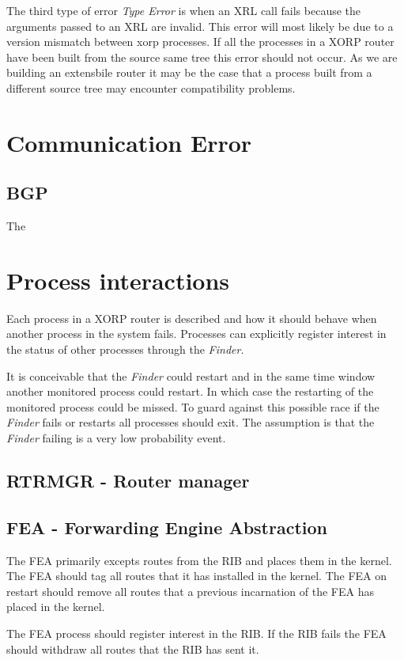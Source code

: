 \documentclass[11pt]{article}
\makeatletter
\newcommand{\finder} {{\em Finder}\@\xspace}
\makeatother
\begin{document}
The third type of error {\em Type Error} is when an XRL call fails
because the arguments passed to an XRL are invalid. This error will
most likely be due to a version mismatch between xorp processes. If
all the processes in a XORP router have been built from the source
same tree this error should not occur. As we are building an
extensbile router it may be the case that a process built from a
different source tree may encounter compatibility problems.

\section{Communication Error}

\subsection{BGP}
The 

\section{Process interactions}
Each process in a XORP router is described and how it should behave
when another process in the system fails. Processes can explicitly
register interest in the status of other processes through the
\finder.

It is conceivable that the \finder could restart and in the same time
window another monitored process could restart. In which case the
restarting of the monitored process could be missed. To guard against
this possible race if the \finder fails or restarts all processes
should exit. The assumption is that the \finder failing is a very low
probability event.

\subsection{RTRMGR - Router manager}


\subsection{FEA - Forwarding Engine Abstraction}
The FEA primarily excepts routes from the RIB and places them in the
kernel. The FEA should tag all routes that it has installed in the
kernel. The FEA on restart should remove all routes that a previous
incarnation of the FEA has placed in the kernel.

The FEA process should register interest in the RIB. If the RIB fails
the FEA should withdraw all routes that the RIB has sent it.
\end{document}
